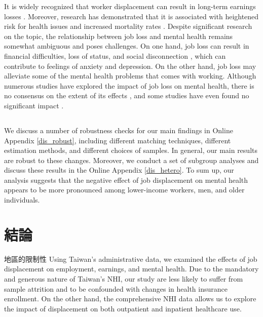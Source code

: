 \documentclass[12pt]{article}
\begin{document}

It is widely recognized that worker displacement can result in long-term earnings losses \citep{Ruhm,Jacobson,lachowska}. Moreover, research has demonstrated that it is associated with heightened risk for health issues and increased mortality rates \citep{Sullivan,Kuhn,Schaller,eliason2009job,eliason2009does,Browning}. Despite significant research on the topic, the relationship between job loss and mental health remains somewhat ambiguous and poses challenges. On one hand, job loss can result in financial difficulties, loss of status, and social disconnection \citep{coope2015characteristics,canavan2021moderating}, which can contribute to feelings of anxiety and depression. On the other hand, job loss may alleviate some of the mental health problems that comes with working. Although numerous studies have explored the impact of job loss on mental health, there is no consensus on the extent of its effects \citep{cygan2017bounding}, and some studies have even found no significant impact \citep{salm2009does,keefe2002serious}.











\subsection{}
We discuss a number of robustness checks for our main findings in Online Appendix \ref{dis_robust}, including different matching techniques, different estimation methods, and different choices of samples. In general, our main results are robust to these changes. Moreover, we conduct a set of subgroup analyses and discuss these results in the Online Appendix \ref{dis_hetero}. To sum up, our analysis suggests that the negative effect of job displacement on mental health appears to be more pronounced among lower-income workers, men, and older individuals.

\section{結論}\label{conclusion}

地區的限制性 Using Taiwan's administrative data, we examined the effects of job displacement on employment, earnings, and mental health. Due to the mandatory and generous nature of Taiwan's NHI, our study are less likely to suffer from sample attrition and to be confounded with changes in health insurance enrollment. On the other hand, the comprehensive NHI data allows us to explore the impact of displacement on both outpatient and inpatient healthcare use.
\end{document}
